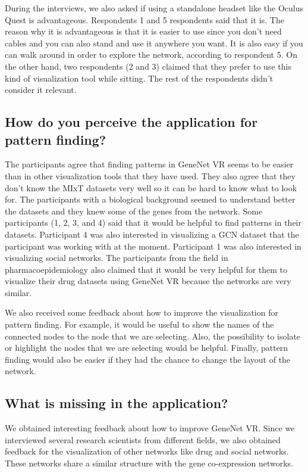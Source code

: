 During the interviews, we also asked if using a standalone headset like the Oculus Quest is advantageous. Respondents 1 and 5 respondents said that it is. The reason why it is advantageous is that it is easier to use since you don't need cables and you can also stand and use it anywhere you want. It is also easy if you can walk around in order to explore the network, according to respondent 5. On the other hand, two respondents (2 and 3) claimed that they prefer to use this kind of visualization tool while sitting. The rest of the respondents didn't consider it relevant.

\subsection{How do you perceive the application for pattern finding?}
The participants agree that finding patterns in GeneNet VR seems to be easier than in other visualization tools that they have used. They also agree that they don't know the MIxT datasets very well so it can be hard to know what to look for. The participants with a biological background seemed to understand better the datasets and they knew some of the genes from the network. Some participants (1, 2, 3, and 4) said that it would be helpful to find patterns in their datasets. Participant 4 was also interested in visualizing a GCN dataset that the participant was working with at the moment. Participant 1 was also interested in visualizing social networks. The participants from the field in pharmacoepidemiology also claimed that it would be very helpful for them to visualize their drug datasets using GeneNet VR because the networks are very similar.

We also received some feedback about how to improve the visualization for pattern finding. For example, it would be useful to show the names of the connected nodes to the node that we are selecting. Also, the possibility to isolate or highlight the nodes that we are selecting would be helpful. Finally, pattern finding would also be easier if they had the chance to change the layout of the network.

\subsection{What is missing in the application?}
We obtained interesting feedback about how to improve GeneNet VR. Since we interviewed several research scientists from different fields, we also obtained feedback for the visualization of other networks like drug and social networks. These networks share a similar structure with the gene co-expression networks.

